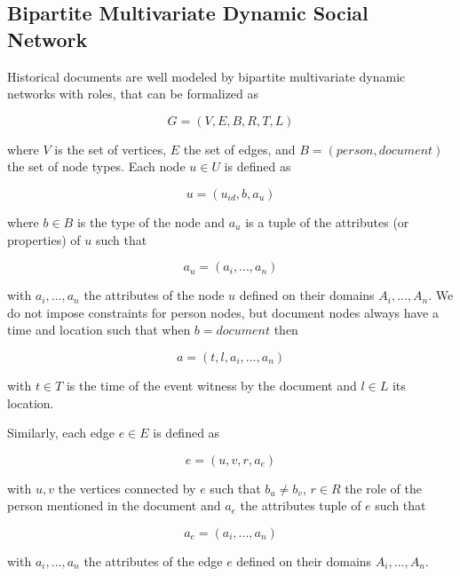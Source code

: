 \subsection{Bipartite Multivariate Dynamic Social Network}

Historical documents are well modeled by bipartite multivariate dynamic networks with roles, that can be formalized as

\begin{equation}
    G = (V, E, B, R, T, L)
\end{equation}

where $V$ is the set of vertices, $E$ the set of edges, and $B = (person, document)$ the set of node types.
Each node $u \in U$ is defined as

\begin{equation}
    u = (u_{id}, b, a_u)
\end{equation}

where $b \in B$ is the type of the node and $a_u$ is a tuple of the attributes (or properties) of $u$ such that

\begin{equation}
    a_u = (a_i, ..., a_n)
\end{equation}

with $a_i, ..., a_n$ the attributes of the node $u$ defined on their domains $A_i, ..., A_n$.
We do not impose constraints for person nodes, but document nodes always have a time and location such that when $b = document$ then

\begin{equation}
    a = (t, l, a_i, ..., a_n)
\end{equation}

with $t \in T$ is the time of the event witness by the document and $l \in L$ its location.

Similarly, each edge $e \in E$ is defined as

\begin{equation}
    e = (u, v, r, a_e)
\end{equation}

with $u, v$ the vertices connected by $e$ such that $b_u \neq b_v$, $r \in R$ the role of the person mentioned in the document and $a_e$ the attributes tuple of $e$ such that

\begin{equation}
    a_e = (a_i, ..., a_n)
\end{equation}

with $a_i, ..., a_n$ the attributes of the edge $e$ defined on their domains $A_i, ..., A_n$.


